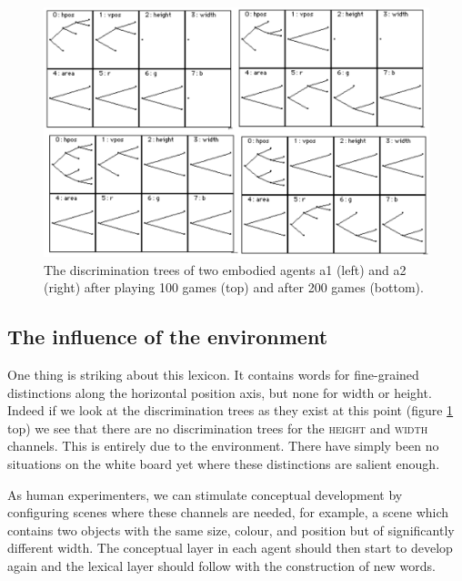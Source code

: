 \begin{figure}[htbp]
  \centerline{\includegraphics[width=.75\textwidth]{chap7/figs/discri200.pdf}}
\caption{\label{discri200}The discrimination trees 
of two embodied agents {\bfshape a1} (left) and {\bfshape a2} (right) 
after playing 100 games (top) and after 200 games (bottom).}
\end{figure}

\subsection{The influence of the environment}

One thing is striking about this lexicon. It contains
words for fine-grained distinctions along the 
horizontal position axis, but none for width or 
height. Indeed if we look at the discrimination
trees as they exist at this point (figure 
\ref{discri200} top) we see that there are no 
discrimination trees for the \textsc{height} and \textsc{width}
channels. This is entirely due to the 
environment. There have simply been no situations on 
the white board yet where these distinctions are salient 
enough. 

As human experimenters, we can stimulate conceptual 
development by configuring scenes where these
channels are needed, for example, a scene 
which contains two objects with the same size, colour, 
and position but of significantly different width. The 
conceptual layer in each agent
should then start to develop again
and the lexical layer should follow with the 
construction of new words. 


